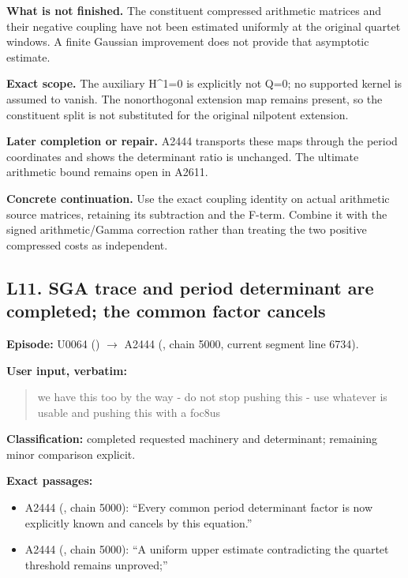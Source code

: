 \documentclass[10pt,a4paper,oneside]{report}
\providecommand{\tightlist}{\setlength{\itemsep}{0pt}\setlength{\parskip}{0pt}}
\begin{document}
\textbf{What is not finished.} The constituent compressed arithmetic
matrices and their negative coupling have not been estimated uniformly
at the original quartet windows. A finite Gaussian improvement does not
provide that asymptotic estimate.

\textbf{Exact scope.} The auxiliary H\^{}1=0 is explicitly not Q=0; no
supported kernel is assumed to vanish. The nonorthogonal extension map
remains present, so the constituent split is not substituted for the
original nilpotent extension.

\textbf{Later completion or repair.} A2444 transports these maps through
the period coordinates and shows the determinant ratio is unchanged. The
ultimate arithmetic bound remains open in A2611.

\textbf{Concrete continuation.} Use the exact coupling identity on
actual arithmetic source matrices, retaining its subtraction and the
F-term. Combine it with the signed arithmetic/Gamma correction rather
than treating the two positive compressed costs as independent.

\subsection{L11. SGA trace and period determinant are completed; the
common factor
cancels}\label{l11.-sga-trace-and-period-determinant-are-completed-the-common-factor-cancels}

\textbf{Episode:} U0064
(\protect{})
\allowbreak{}\ensuremath{→}\allowbreak{} A2444
(\protect{}, chain 5000,
current segment line 6734).

\textbf{User input, verbatim:}

\begin{quote}
we have this too by the way - do not stop pushing this - use whatever is
usable and pushing this with a foc8us
\end{quote}

\textbf{Classification:} completed requested machinery and determinant;
remaining minor comparison explicit.

\textbf{Exact passages:}

\begin{itemize}
\tightlist
\item
  A2444 (\protect{}, chain
  5000): ``Every common period determinant factor is now explicitly
  known and cancels by this equation.''
\item
  A2444 (\protect{}, chain
  5000): ``A uniform upper estimate contradicting the quartet threshold
  remains unproved;''
\end{itemize}
\end{document}
